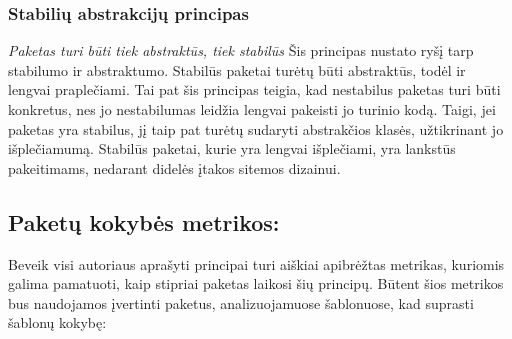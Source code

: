 \subsubsection{Stabilių abstrakcijų principas}
\textit{Paketas turi būti tiek abstraktūs, tiek stabilūs}
Šis principas nustato ryšį tarp stabilumo ir abstraktumo.
Stabilūs paketai turėtų būti abstraktūs, todėl ir lengvai praplečiami.
Tai pat šis principas teigia, kad nestabilus paketas turi būti konkretus, nes jo nestabilumas leidžia lengvai pakeisti jo turinio kodą.
Taigi, jei paketas yra stabilus, jį taip pat turėtų sudaryti abstrakčios klasės, užtikrinant jo išplečiamumą.
Stabilūs paketai, kurie yra lengvai išplečiami, yra lankstūs pakeitimams, nedarant didelės įtakos sitemos dizainui\cite{AgileSoftwareDevelopment}.

\subsection{Paketų kokybės metrikos:}
Beveik visi autoriaus aprašyti principai turi aiškiai apibrėžtas metrikas, kuriomis galima pamatuoti, kaip stipriai paketas laikosi šių principų.
Būtent šios metrikos bus naudojamos įvertinti paketus, analizuojamuose šablonuose, kad suprasti šablonų kokybę:
